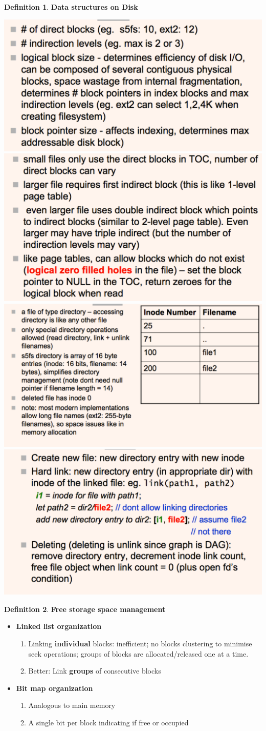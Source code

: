 \documentclass[11pt,a4paper]{article}
\theoremstyle{definition}
\newtheorem{definition}{Definition}[section]
\newenvironment{myitemize}
{ \begin{itemize}
    \setlength{\itemsep}{5pt}
    \setlength{\parskip}{0pt}
    \setlength{\parsep}{0pt}     }
{ \end{itemize}                  }
\newenvironment{myenumerate}
{ \begin{enumerate}
    \setlength{\itemsep}{5pt}
    \setlength{\parskip}{0pt}
    \setlength{\parsep}{0pt}     }
{ \end{enumerate}                }
\begin{document}
\begin{definition}{\textbf{Data structures on Disk}}
\begin{myitemize}
\begin{myenumerate}
			\includegraphics[width=0.50\linewidth]{m2/systemVFileSystem5}
			\includegraphics[width=0.50\linewidth]{m2/systemVFileSystem6}
			\includegraphics[width=0.50\linewidth]{m2/systemVFileSystem7}
			\includegraphics[width=0.50\linewidth]{m2/systemVFileSystem8}
		\end{myenumerate}
	\end{myitemize}
\end{definition}

\begin{definition}{\textbf{Free storage space management}}
	\begin{myitemize}
		\item \textbf{Linked list organization}
		\begin{myenumerate}
			\item Linking \textbf{individual} blocks: inefficient; no blocks clustering to minimise seek operations; groups of blocks are allocated/released one at a time.
			\item Better: Link \textbf{groups} of consecutive blocks
		\end{myenumerate}
		\item \textbf{Bit map organization}
		\begin{myenumerate}
			\item Analogous to main memory
			\item A single bit per block indicating if free or occupied
		\end{myenumerate}
	\end{myitemize}
\end{definition}

\end{document}
